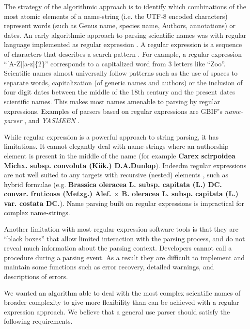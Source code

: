 \documentclass{bmcart}
\begin{document}
The strategy of the algorithmic approach is to identify which combinations of the most atomic elements of a name-string (i.e. the UTF-8 encoded characters) represent words (such as Genus name, species name, Authors, annotations) or dates.  An early algorithmic approach to parsing scientific names was with regular
language implemented as regular expression \cite{Leary2007}. A regular expression
is a sequence of characters that describes a search pattern
\cite{aho1992foundations}. For example, a regular expression ``[A-Z][a-z]\{2\}''
corresponds to a capitalized word from 3 letters like ``Zoo''. Scientific names almost universally follow patterns such as the use of spaces to separate words, capitalization (of generic names and authors) or the inclusion of four digit dates between the middle of the 18th century and the present dates scientific names. This makes most names amenable to parsing by regular expressions.  Examples of
parsers based on regular expressions are GBIF's \textit{name-parser}
\cite{gbifNameParser}, and \textit{YASMEEN} \cite{VandenBerghe2015}.

While regular expression is a powerful approach to string parsing,  it has
limitations. It cannot elegantly deal with name-strings where an authorship element is present in the middle of the name (for example
\textbf{Carex scirpoidea Michx. subsp.  convoluta (Kük.) D.A.Dunlop}).  Indeedm regular expressions are not well suited to any targets 
with recursive (nested) elements \cite{yu1997handbook}, such as hybrid formulae (e.g. \textbf{Brassica oleracea L.
subsp.  capitata (L.) DC. convar. fruticosa (Metzg.) Alef.  $\times$ B.
oleracea L. subsp. capitata (L.) var.  costata DC.}). Name parsing built on
regular expressions is impractical for complex name-strings.

Another limitation with most regular expression software tools is that they are ``black
boxes'' that allow limited interaction with the parsing process, and do not reveal much information about the parsing context. Developers cannot call a
procedure during a parsing event. As a result they are difficult to implement and maintain some functions such as error recovery, detailed warnings, and descriptions of errors.

We wanted an algorithm able to deal with the most complex scientific names of broader
complexity to give more flexibility than can be achieved with a regular expression approach.  We
believe that a general use parser should satisfy the following requirements.
\end{document}

